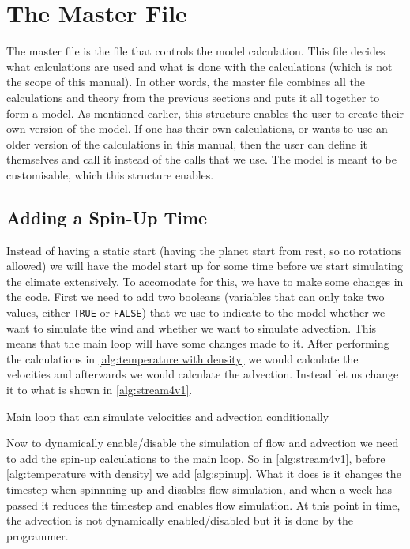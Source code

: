 \section{The Master File}
The master file is the file that controls the model calculation. This file decides what calculations are used and  what is done with the calculations (which is not the scope of this manual).
In other words, the master file combines all the calculations and theory from the previous sections and puts it all together to form a model. As mentioned earlier, this structure enables the 
user to create their own version of the model. If one has their own calculations, or wants to use an older version of the calculations in this manual, then the user can define it themselves
and call it instead of the calls that we use. The model is meant to be customisable, which this structure enables.

\subsection{Adding a Spin-Up Time}
Instead of having a static start (having the planet start from rest, so no rotations allowed) we will have the model start up for some time before we start simulating the climate extensively.
To accomodate for this, we have to make some changes in the code. First we need to add two booleans (variables that can only take two values, either \texttt{TRUE} or \texttt{FALSE}) that we use
to indicate to the model whether we want to simulate the wind and whether we want to simulate advection. This means that the main loop will have some changes made to it. After performing the 
calculations in \autoref{alg:temperature with density} we would calculate the velocities and afterwards we would calculate the advection. Instead let us change it to what is shown in 
\autoref{alg:stream4v1}.

\begin{algorithm}
    \caption{Main loop that can simulate velocities and advection conditionally}
    \label{alg:stream4v1}
\end{algorithm}

Now to dynamically enable/disable the simulation of flow and advection we need to add the spin-up calculations to the main loop. So in \autoref{alg:stream4v1}, before 
\autoref{alg:temperature with density} we add \autoref{alg:spinup}. What it does is it changes the timestep when spinnning up and disables flow simulation, and when a week has passed it reduces 
the timestep and enables flow simulation. At this point in time, the advection is not dynamically enabled/disabled but it is done by the programmer.

